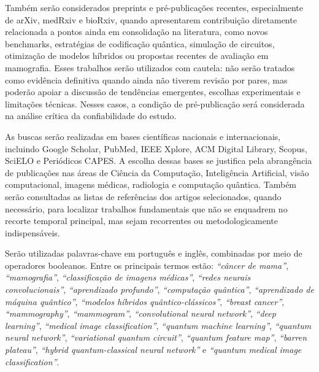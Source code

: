 \documentclass[
    12pt,
    openright,
    oneside,
    a4paper,
    english,
    brazil
]{abntex2}
\begin{document}
Também serão considerados preprints e pré-publicações recentes, especialmente de arXiv, medRxiv e bioRxiv, quando apresentarem contribuição diretamente relacionada a pontos ainda em consolidação na literatura, como novos benchmarks, estratégias de codificação quântica, simulação de circuitos, otimização de modelos híbridos ou propostas recentes de avaliação em mamografia. Esses trabalhos serão utilizados com cautela: não serão tratados como evidência definitiva quando ainda não tiverem revisão por pares, mas poderão apoiar a discussão de tendências emergentes, escolhas experimentais e limitações técnicas. Nesses casos, a condição de pré-publicação será considerada na análise crítica da confiabilidade do estudo.

As buscas serão realizadas em bases científicas nacionais e internacionais, incluindo Google Scholar, PubMed, IEEE Xplore, ACM Digital Library, Scopus, SciELO e Periódicos CAPES. A escolha dessas bases se justifica pela abrangência de publicações nas áreas de Ciência da Computação, Inteligência Artificial, visão computacional, imagens médicas, radiologia e computação quântica. Também serão consultadas as listas de referências dos artigos selecionados, quando necessário, para localizar trabalhos fundamentais que não se enquadrem no recorte temporal principal, mas sejam recorrentes ou metodologicamente indispensáveis.

Serão utilizadas palavras-chave em português e inglês, combinadas por meio de operadores booleanos. Entre os principais termos estão: \textit{``câncer de mama''}, \textit{``mamografia''}, \textit{``classificação de imagens médicas''}, \textit{``redes neurais convolucionais''}, \textit{``aprendizado profundo''}, \textit{``computação quântica''}, \textit{``aprendizado de máquina quântico''}, \textit{``modelos híbridos quântico-clássicos''}, \textit{``breast cancer''}, \textit{``mammography''}, \textit{``mammogram''}, \textit{``convolutional neural network''}, \textit{``deep learning''}, \textit{``medical image classification''}, \textit{``quantum machine learning''}, \textit{``quantum neural network''}, \textit{``variational quantum circuit''}, \textit{``quantum feature map''}, \textit{``barren plateau''}, \textit{``hybrid quantum-classical neural network''} e \textit{``quantum medical image classification''}.
\end{document}

